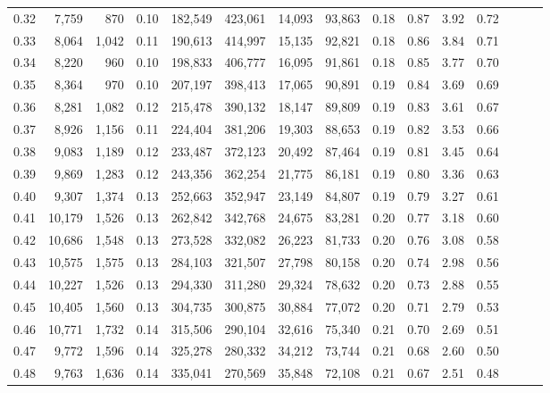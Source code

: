 \begin{tabular}{rrrrrrrrrrrrrrr}
0.32 &   7,759 &    870 &  0.10 &  182,549 &  423,061 &   14,093 &   93,863 &  0.18 &  0.87 &  3.92 &      0.72 \\
0.33 &   8,064 &  1,042 &  0.11 &  190,613 &  414,997 &   15,135 &   92,821 &  0.18 &  0.86 &  3.84 &      0.71 \\
0.34 &   8,220 &    960 &  0.10 &  198,833 &  406,777 &   16,095 &   91,861 &  0.18 &  0.85 &  3.77 &      0.70 \\
0.35 &   8,364 &    970 &  0.10 &  207,197 &  398,413 &   17,065 &   90,891 &  0.19 &  0.84 &  3.69 &      0.69 \\
0.36 &   8,281 &  1,082 &  0.12 &  215,478 &  390,132 &   18,147 &   89,809 &  0.19 &  0.83 &  3.61 &      0.67 \\
0.37 &   8,926 &  1,156 &  0.11 &  224,404 &  381,206 &   19,303 &   88,653 &  0.19 &  0.82 &  3.53 &      0.66 \\
0.38 &   9,083 &  1,189 &  0.12 &  233,487 &  372,123 &   20,492 &   87,464 &  0.19 &  0.81 &  3.45 &      0.64 \\
0.39 &   9,869 &  1,283 &  0.12 &  243,356 &  362,254 &   21,775 &   86,181 &  0.19 &  0.80 &  3.36 &      0.63 \\
0.40 &   9,307 &  1,374 &  0.13 &  252,663 &  352,947 &   23,149 &   84,807 &  0.19 &  0.79 &  3.27 &      0.61 \\
0.41 &  10,179 &  1,526 &  0.13 &  262,842 &  342,768 &   24,675 &   83,281 &  0.20 &  0.77 &  3.18 &      0.60 \\
0.42 &  10,686 &  1,548 &  0.13 &  273,528 &  332,082 &   26,223 &   81,733 &  0.20 &  0.76 &  3.08 &      0.58 \\
0.43 &  10,575 &  1,575 &  0.13 &  284,103 &  321,507 &   27,798 &   80,158 &  0.20 &  0.74 &  2.98 &      0.56 \\
0.44 &  10,227 &  1,526 &  0.13 &  294,330 &  311,280 &   29,324 &   78,632 &  0.20 &  0.73 &  2.88 &      0.55 \\
0.45 &  10,405 &  1,560 &  0.13 &  304,735 &  300,875 &   30,884 &   77,072 &  0.20 &  0.71 &  2.79 &      0.53 \\
0.46 &  10,771 &  1,732 &  0.14 &  315,506 &  290,104 &   32,616 &   75,340 &  0.21 &  0.70 &  2.69 &      0.51 \\
0.47 &   9,772 &  1,596 &  0.14 &  325,278 &  280,332 &   34,212 &   73,744 &  0.21 &  0.68 &  2.60 &      0.50 \\
0.48 &   9,763 &  1,636 &  0.14 &  335,041 &  270,569 &   35,848 &   72,108 &  0.21 &  0.67 &  2.51 &      0.48 \\

\end{tabular}
